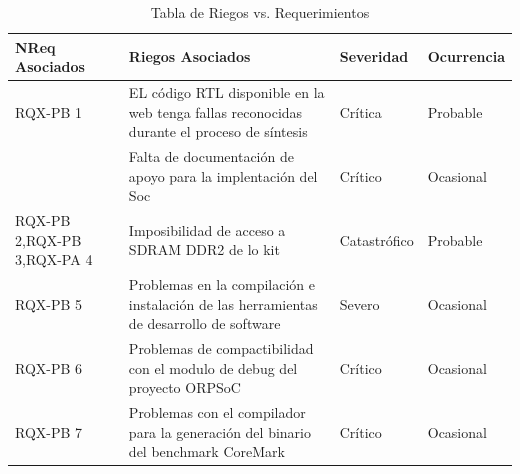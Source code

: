 		\begin{table}[h!]
		\centering
		\begin{tabular}{ p{2.5cm} p{9cm} p{2cm} p{2cm} }
		\hline 
		\rowcolor[gray]{0.8} N\textordmasculine Req Asociados& Riegos Asociados & Severidad  & Ocurrencia \\
		\hline
		RQX-PB 1& EL código RTL disponible en la web tenga fallas reconocidas durante el proceso de síntesis & Crítica       & Probable \\
		\hline				
				& Falta de documentación de apoyo para la implentación
del Soc & Crítico & Ocasional\\	 
		\hline
		RQX-PB 2,RQX-PB 3,RQX-PA 4 & Imposibilidad de acceso a SDRAM DDR2 de lo kit& Catastrófico & Probable\\
		\hline
		RQX-PB 5&Problemas en la compilación e instalación de las herramientas de desarrollo de software  & Severo  &  Ocasional\\ 
		\hline
		RQX-PB 6& Problemas de compactibilidad con el modulo de debug del proyecto ORPSoC  & Crítico&  Ocasional\\
		\hline
		RQX-PB 7 & Problemas con el compilador para la generación del binario del benchmark CoreMark  & Crítico&  Ocasional\\
		\hline
		\end{tabular}
		\caption{Tabla de Riegos vs. Requerimientos}
		\end{table}

\newpage

